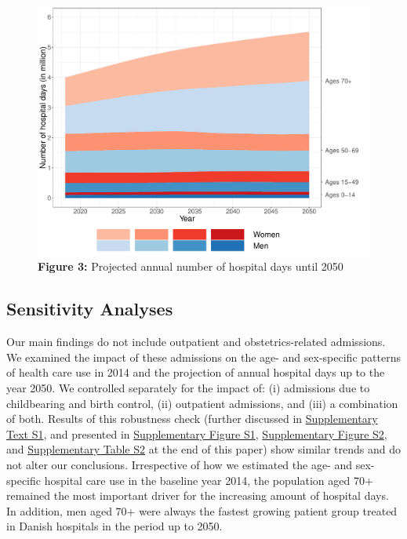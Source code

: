 	\begin{figure}[H]
		\centering
		\includegraphics[scale=0.450]{Paper_4/MAIN_Figure_3.pdf}
		\caption*{	\textbf{Figure 3:} Projected annual number of hospital days until 2050}
	\label{ch5:fig3}
	\end{figure}


\subsection{Sensitivity Analyses}

Our main findings do not include outpatient and obstetrics-related admissions. We 
examined the impact of these admissions on the age- and sex-specific patterns of 
health care use in 2014 and the projection of annual hospital days up to the year 
2050. We controlled separately for the impact of: (i) admissions due to childbearing 
and birth control, (ii) outpatient admissions, and (iii) a combination of both. 
Results of this robustness check (further discussed in \hyperref[ch5:textS1]{Supplementary Text S1}, and 
presented in \hyperref[ch5:figS1]{Supplementary Figure S1}, \hyperref[ch5:figS2]{Supplementary Figure S2}, 
and \hyperref[ch5:tabS2]{Supplementary Table S2} at the end of this paper) show 
similar trends and do not alter our conclusions. Irrespective of how we estimated 
the age- and sex-specific hospital care use in the baseline year 2014, the population 
aged 70+ remained the most important driver for the increasing amount of hospital 
days. In addition, men aged 70+ were always the fastest growing patient group treated 
in Danish hospitals in the period up to 2050. \\


